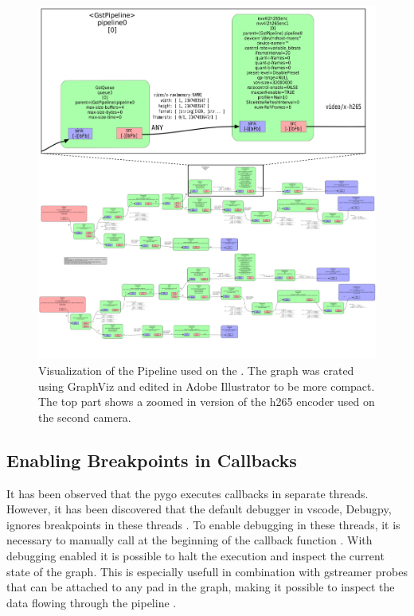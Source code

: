 \begin{figure}[H]
    \centering
    \includegraphics[width=\textwidth]{figures/gstreamer/gstreamer_pipeline.pdf}
    \caption{Visualization of the \gs Pipeline used on the \sr.
        The graph was crated using GraphViz and edited in Adobe Illustrator to be more compact.
        The top part shows a zoomed in version of the \gls{h265} encoder used on the second camera.}
    \label{fig:gs_pipeline_visualization}
\end{figure}

\subsection{Enabling Breakpoints in Callbacks}
It has been observed that the \gls{pygo} executes callbacks in separate threads.
However, it has been discovered that the default debugger in \gls{vscode}, Debugpy, ignores breakpoints in these threads \cite{microsoftDebugpyDebuggerPython2023}\cite{visualstudiocodeDebuggingConfigurationsPython2023}.
To enable debugging in these threads, it is necessary to manually call  at the beginning of the callback function \cite{nadigAnswerDebugNot2019}.
With debugging enabled it is possible to halt the execution and inspect the current state of the graph.
This is especially usefull in combination with \gls{gstreamer} probes that can be attached to any pad in the graph, making it possible to inspect the data flowing through the pipeline \cite{gstreamerProbes}.


